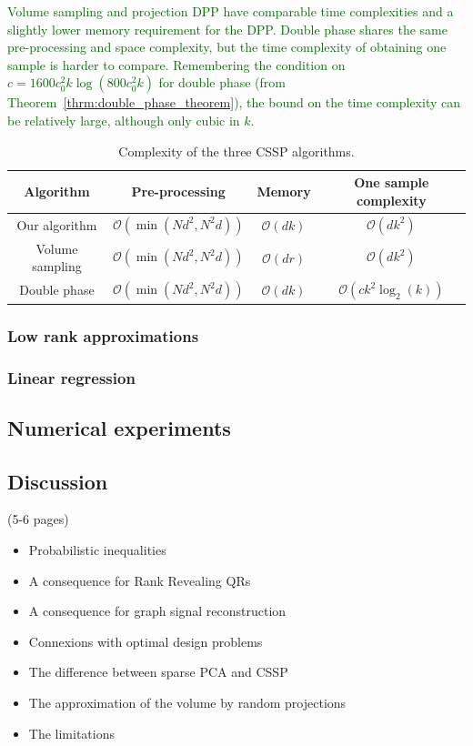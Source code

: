 \documentclass[twoside,11pt]{book}
\newcommand{\rev}[1]{\textcolor{darkgreen}{#1}}
\begin{document}
\rev{Volume sampling and projection DPP have comparable time complexities and a slightly lower memory requirement for the DPP. Double phase shares the same pre-processing and space complexity, but the time complexity of obtaining one sample is harder to compare. Remembering the condition on $c = 1600 c_{0}^{2}k \log(800 c_{0}^{2} k)$ for double phase (from Theorem~\ref{thrm:double_phase_theorem}), the bound on the time complexity can be relatively large, although only cubic in $k$.}
\begin{table}
\centering
 \begin{tabular}{| c| c| c| c|}
 \hline
  Algorithm & Pre-processing & Memory & One sample complexity\\
 \hline
 Our algorithm & $\mathcal{O}(\min(N d^{2},N^{2}d))$ & $\mathcal{O}(dk)$ & $\mathcal{O}(dk^{2})$\\
 \hline
 Volume sampling & $\mathcal{O}(\min(N d^{2},N^{2}d))$ & $\mathcal{O}(dr)$ & $\mathcal{O}(dk^{2})$ \\
 \hline
 Double phase  & $\mathcal{O}(\min(N d^{2},N^{2}d))$ & $\mathcal{O}(dk)$ & $\mathcal{O}(c k^{2} \log_{2}(k))$\\
 \hline
\end{tabular}
\caption{Complexity of the three CSSP algorithms.\label{table:CSSP_complexity}}
\end{table}

\subsubsection{Low rank approximations}
\subsubsection{Linear regression}
\subsection{Numerical experiments}
\subsection{Discussion} (5-6 pages)
\begin{itemize}
\item Probabilistic inequalities
\item A consequence for Rank Revealing QRs
\item A consequence for graph signal reconstruction
\item Connexions with optimal design problems
\item The difference between sparse PCA and CSSP
\item The approximation of the volume by random projections 
\item The limitations 
\end{itemize}
\end{document}
